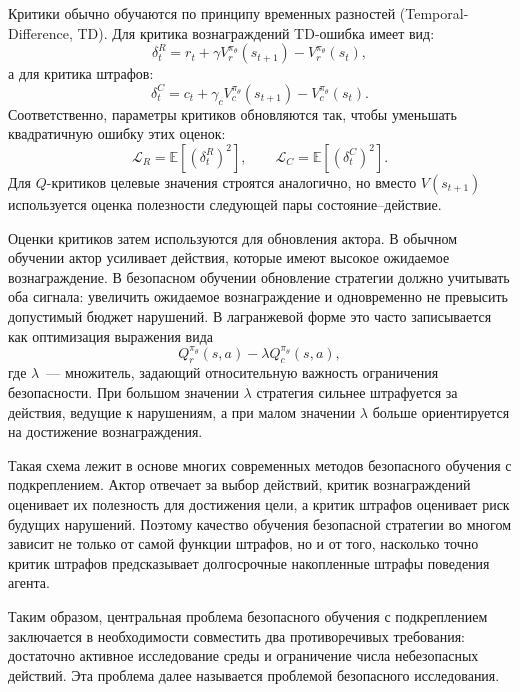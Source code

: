 Критики обычно обучаются по принципу временных разностей (Temporal-Difference, TD). Для критика вознаграждений TD-ошибка имеет вид:
\begin{equation}
\delta_t^R =
r_t + \gamma V^{\pi_\theta}_r(s_{t+1}) - V^{\pi_\theta}_r(s_t),
\end{equation}
а для критика штрафов:
\begin{equation}
\delta_t^C =
c_t + \gamma_c V^{\pi_\theta}_c(s_{t+1}) - V^{\pi_\theta}_c(s_t).
\end{equation}
Соответственно, параметры критиков обновляются так, чтобы уменьшать квадратичную ошибку этих оценок:
\begin{equation}
\mathcal{L}_R =
\mathbb{E}\left[(\delta_t^R)^2\right],
\qquad
\mathcal{L}_C =
\mathbb{E}\left[(\delta_t^C)^2\right].
\end{equation}
Для $Q$-критиков целевые значения строятся аналогично, но вместо $V(s_{t+1})$ используется оценка полезности следующей пары состояние--действие.

Оценки критиков затем используются для обновления актора. В обычном обучении актор усиливает действия, которые имеют высокое ожидаемое вознаграждение. В безопасном обучении обновление стратегии должно учитывать оба сигнала: увеличить ожидаемое вознаграждение и одновременно не превысить допустимый бюджет нарушений. В лагранжевой форме это часто записывается как оптимизация выражения вида
\begin{equation}
Q^{\pi_\theta}_r(s,a) - \lambda Q^{\pi_\theta}_c(s,a),
\end{equation}
где $\lambda$~--- множитель, задающий относительную важность ограничения безопасности. При большом значении $\lambda$ стратегия сильнее штрафуется за действия, ведущие к нарушениям, а при малом значении $\lambda$ больше ориентируется на достижение вознаграждения.

Такая схема лежит в основе многих современных методов безопасного обучения с подкреплением. Актор отвечает за выбор действий, критик вознаграждений оценивает их полезность для достижения цели, а критик штрафов оценивает риск будущих нарушений. Поэтому качество обучения безопасной стратегии во многом зависит не только от самой функции штрафов, но и от того, насколько точно критик штрафов предсказывает долгосрочные накопленные штрафы поведения агента.

Таким образом, центральная проблема безопасного обучения с подкреплением заключается в необходимости совместить два противоречивых требования: достаточно активное исследование среды и ограничение числа небезопасных действий. Эта проблема далее называется проблемой безопасного исследования.

